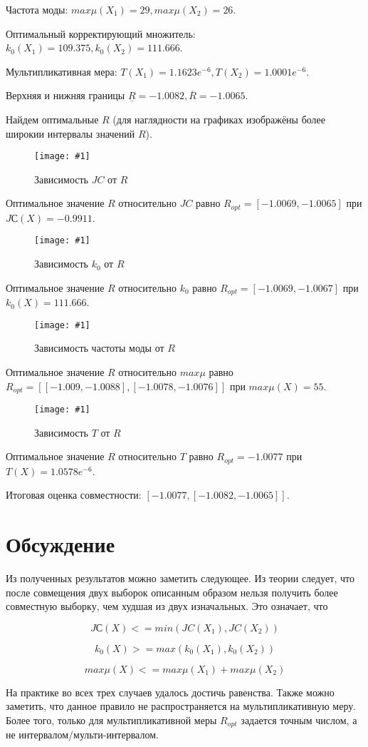 \documentclass[a4paper,12pt]{article}
\newcommand{\plot}[3]{
    \begin{figure}[H]
        \begin{center}
            \texttt{[image: \#1]}
            \caption{#2}
            \label{#3}
        \end{center}
    \end{figure}
}
\begin{document}
    Частота моды: $ max\mu(X_1) = 29, max\mu(X_2) = 26 $.

    Оптимальный корректирующий множитель: $ k_0(X_1) = 109.375, k_0(X_2) = 111.666 $.

    Мультипликативная мера: $ T(X_1) = 1.1623e^{-6}, T(X_2) = 1.0001e^{-6} $.
    
    Верхняя и нижняя границы $ \underline{R} = -1.0082, \overline{R} = -1.0065 $.
    
    Найдем оптимальные $ R $
    (для наглядности на графиках изображёны более широкии интервалы значений $ R $).
    \plot{img/sum signal JС.png}{Зависимость $ JC $ от $ R $}{p:jaccard}

    Оптимальное значение $ R $ относительно $ JC $ равно $ R_{opt} = [-1.0069, -1.0065] $
    при $ JС(X) = -0.9911 $. 
    \plot{img/sum signal k.png}{Зависимость $ k_0 $ от $ R $}{p:k_0}

    Оптимальное значение $ R $ относительно $ k_0 $ равно $ R_{opt} = [-1.0069, -1.0067] $
    при $ k_0(X) = 111.666 $.
    \plot{img/sum signal maxmu.png}{Зависимость частоты моды от $ R $}{p:max_mu}

    Оптимальное значение $ R $ относительно $ max\mu $ равно $ R_{opt} = [[-1.009, -1.0088], [-1.0078, -1.0076]] $
    при $ max\mu(X) = 55 $.
    \plot{img/sum signal mult measure.png}{Зависимость $ T $ от $ R $}{p:t}

    Оптимальное значение $ R $ относительно $ T $ равно $ R_{opt} = -1.0077 $
    при $ T(X) = 1.0578e^{-6} $.

    Итоговая оценка совместности: $ [-1.0077, [-1.0082, -1.0065]] $.

    \section{Обсуждение}
    \quad Из полученных результатов можно заметить следующее. Из теории следует, что после совмещения двух выборок описанным образом нельзя получить более совместную выборку, чем худшая из двух
    изначальных. Это означает, что 
    
    \begin{equation}
        JС(X) <= min(JC(X_1), JC(X_2)) 
    \end{equation}

    \begin{equation}
        k_0(X) >= max(k_0(X_1), k_0(X_2))
    \end{equation}
    
    \begin{equation}
        max\mu(X) <= max\mu(X_1) + max\mu(X_2)
    \end{equation}
    
    На практике во всех трех случаев удалось достичь равенства. Также можно заметить, что
    данное правило не распространяется на мультипликативную меру. Более того, только для
    мультипликативной меры $ R_{opt} $ задается точным числом, а не интервалом/мульти-интервалом.
\end{document}

